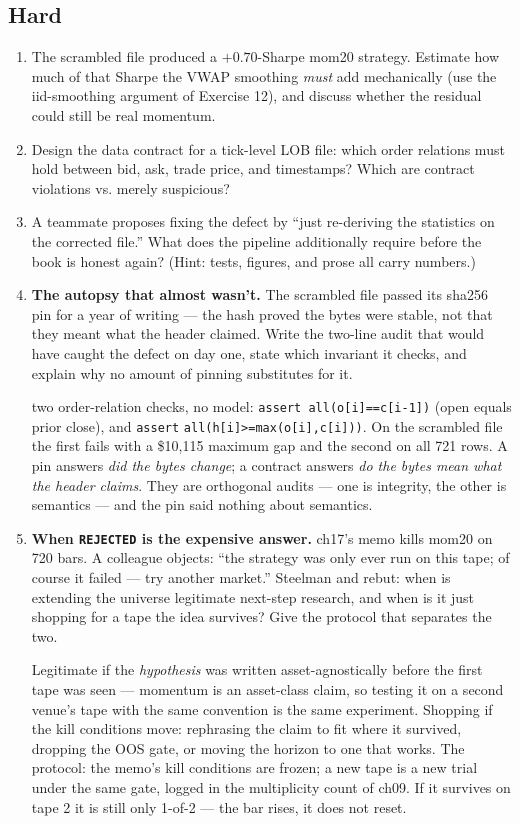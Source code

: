 \subsection*{Hard}
\begin{enumerate}
\item The scrambled file produced a $+0.70$-Sharpe mom20
strategy. Estimate how much of that Sharpe the VWAP smoothing
\emph{must} add mechanically (use the iid-smoothing argument of
Exercise 12), and discuss whether the residual could still be
real momentum.
\item Design the data contract for a tick-level LOB file:
which order relations must hold between bid, ask, trade price,
and timestamps? Which are contract violations vs. merely
suspicious?
\item A teammate proposes fixing the defect by
``just re-deriving the statistics on the corrected file.''
What does the pipeline additionally require before the book is
honest again? (Hint: tests, figures, and prose all carry
numbers.)
\item \textbf{The autopsy that almost wasn't.} The scrambled file
passed its sha256 pin for a year of writing --- the hash proved the
bytes were stable, not that they meant what the header claimed.
Write the two-line audit that would have caught the defect on day
one, state which invariant it checks, and explain why no amount of
pinning substitutes for it.
\begin{solution}
two order-relation checks, no model:
\texttt{assert all(o[i]==c[i-1])} (open equals prior close), and
\texttt{assert} \texttt{all(h[i]>=max(o[i],c[i]))}. On the scrambled file the first fails with a
\$10{,}115 maximum gap and the second on all 721 rows. A pin
answers \emph{did the bytes change}; a contract answers \emph{do
the bytes mean what the header claims}. They are orthogonal audits
--- one is integrity, the other is semantics --- and the pin said
nothing about semantics.
\end{solution}
\item \textbf{When \texttt{REJECTED} is the expensive answer.}
ch17's memo kills mom20 on 720 bars. A colleague objects: ``the
strategy was only ever run on this tape; of course it failed ---
try another market.'' Steelman and rebut: when is extending the
universe legitimate next-step research, and when is it just
shopping for a tape the idea survives? Give the protocol that
separates the two.
\begin{solution}
Legitimate if the \emph{hypothesis} was written asset-agnostically
before the first tape was seen --- momentum is an asset-class
claim, so testing it on a second venue's tape with the same
convention is the same experiment. Shopping if the kill conditions
move: rephrasing the claim to fit where it survived, dropping the
OOS gate, or moving the horizon to one that works. The protocol:
the memo's kill conditions are frozen; a new tape is a new trial
under the same gate, logged in the multiplicity count of ch09. If
it survives on tape 2 it is still only 1-of-2 --- the bar rises,
it does not reset.
\end{solution}
\end{enumerate}
